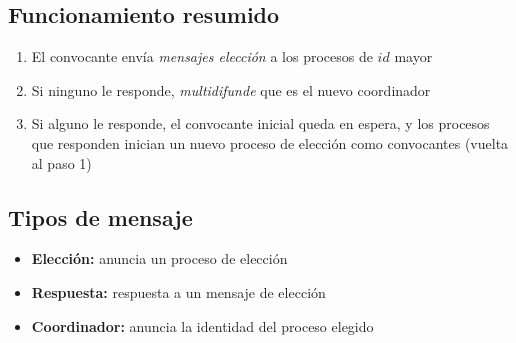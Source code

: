 \documentclass[a4paper,12pt]{article}
\begin{document}
\subsection*{Funcionamiento resumido}

\begin{enumerate}
    \item El convocante envía \textit{mensajes elección} a los procesos de $id$ mayor
    \item Si ninguno le responde, \textit{multidifunde} que es el nuevo coordinador
    \item Si alguno le responde, el convocante inicial queda en espera, y los procesos que responden
         inician un nuevo proceso de elección como convocantes (vuelta al paso 1)
\end{enumerate}

\subsection*{Tipos de mensaje}

\begin{itemize}
    \item \textbf{Elección:} anuncia un proceso de elección
    \item \textbf{Respuesta:} respuesta a un mensaje de elección
    \item \textbf{Coordinador:} anuncia la identidad del proceso elegido
\end{itemize}
\end{document}
